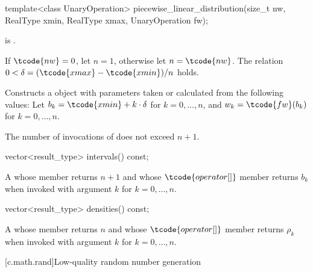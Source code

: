 %
\begin{itemdecl}
template<class UnaryOperation>
  piecewise_linear_distribution(size_t nw, RealType xmin, RealType xmax, UnaryOperation fw);
\end{itemdecl}

\begin{itemdescr}
\pnum
\mandates
{} is .

\pnum
\expects
 If $\tcode{nw} = 0$, let $n = 1$, otherwise let $n = \tcode{nw}$.
 The relation $0 < \delta = (\tcode{xmax} - \tcode{xmin}) / n$
 holds.

\pnum
\effects
Constructs a  object
 with parameters taken or calculated
 from the following values:
 Let $b_k = \tcode{xmin} + k \cdot \delta$ for $k = 0, \dotsc, n$,
 and $w_k = \tcode{fw}(b_k)$ for $k = 0, \dotsc, n$.

\pnum
\complexity
The number of invocations of  does not exceed $n+1$.
\end{itemdescr}

%
\begin{itemdecl}
vector<result_type> intervals() const;
\end{itemdecl}

\begin{itemdescr}
\pnum
\returns
A 
 whose  member returns $n + 1$
 and whose $ \tcode{operator[]} $ member returns $b_k$
 when invoked with argument $k$ for $k = 0, \dotsc, n$.
\end{itemdescr}

%
\begin{itemdecl}
vector<result_type> densities() const;
\end{itemdecl}

\begin{itemdescr}
\pnum
\returns
A 
 whose  member returns $n$
 and whose $ \tcode{operator[]} $ member returns $\rho_k$
 when invoked with argument $k$ for $k = 0, \dotsc, n$.
\end{itemdescr}%
%
%
%
%

[c.math.rand]{Low-quality random number generation}

